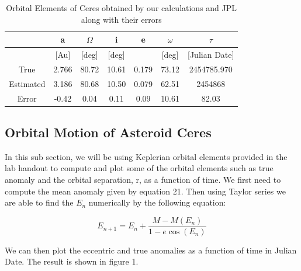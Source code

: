\documentclass[letterpaper,12pt]{article}
\begin{document}
\FloatBarrier
\begin{table}[h!]
\caption{Orbital Elements of Ceres obtained by our calculations and JPL along with their errors} %
\centering %
\begin{tabular}{| c | c | c | c | c | c | c |} %
\hline %
 & a & \begin{math} \Omega \end{math}  & i & e & \begin{math} \omega \end{math}  & \begin{math} \tau \end{math} \\ [0.5ex] %
\hline %
  & [Au]  &  [deg] &[deg] & & [deg] & [Julian Date] \\ \hline 
True & 2.766 &  80.72 &   10.61 & 0.179 & 73.12 &2454785.970\\ \hline
Estimated &3.186 &  80.68 & 10.50 &  0.079 & 62.51 & 2454868\\  \hline
Error & -0.42 &  0.04 &    0.11 &   0.09 & 10.61 & 82.03\\[1ex] %
\hline %
\end{tabular}
\label{table:nonlin} %
\end{table}
\FloatBarrier

\subsection{Orbital Motion of Asteroid Ceres}
In this sub section, we will be using Keplerian orbital elements provided in the lab handout to compute and plot some of the orbital elements such as true anomaly and the orbital separation, r, as a function of time. 
We first need to compute the mean anomaly given by equation 21. Then using Taylor series we are able to find the \begin{math} E_{n} \end{math} numerically by the following equation:

\begin{equation}
E_{n+1}=E_{n}+\frac{M-M(E_{n})}{1-e\cos(E_{n})}
\end{equation}


We can then plot the eccentric and true anomalies as a function of time in Julian Date. The result is shown in figure 1.
\end{document}
